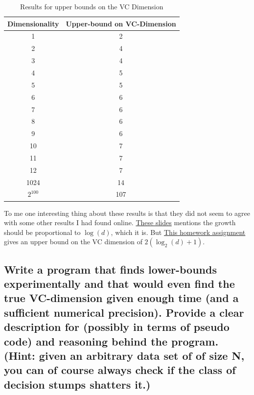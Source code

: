 \documentclass[11pt,a4paper]{article}
\begin{document}
\begin{table}
    \begin{tabular}{|c|c|}
    \hline
    Dimensionality & Upper-bound on VC-Dimension \\ \hline
    1              & 2                            \\ \hline
    2              & 4                            \\ \hline
    3              & 4                            \\ \hline
    4              & 5                            \\ \hline
    5              & 5                            \\ \hline
    6              & 6                            \\ \hline
    7              & 6                           \\ \hline
    8              & 6                            \\ \hline

    9              & 6                            \\ \hline
    10              & 7                            \\ \hline
    11             & 7                            \\ \hline
    12              & 7                            \\ \hline

    
    1024           & 14                            \\ \hline
    $2^{100}$        & 107 \\
    \hline
    \end{tabular}
    \caption{Results for upper bounds on the VC Dimension}
    \label{tab:upper-bound-vc}
\end{table}

To me one interesting thing about these results is that they did not seem to agree with some other results I had found online. \href{https://people.csail.mit.edu/alinush/6.867-fall-2013/2013.10.22.w8.tu-lecture-13-generalization-part-2.pdf}{These slides} mentions the growth should be proportional to $\log(d)$, which it is. But \href{http://courses.cms.caltech.edu/cs253/hw/hw2.pdf}{This homework assignment} gives an upper bound on the VC dimension of $2(\log_2(d) + 1)$. 

\subsection{Write a program that finds lower-bounds experimentally and that would even find the true VC-dimension given enough time (and a sufficient numerical precision). Provide a clear description for (possibly in terms of pseudo code) and reasoning behind the program. (Hint: given an arbitrary data set of of size N, you can of course always check if the class of decision stumps shatters it.)}
\label{sec:2f}
\end{document}
